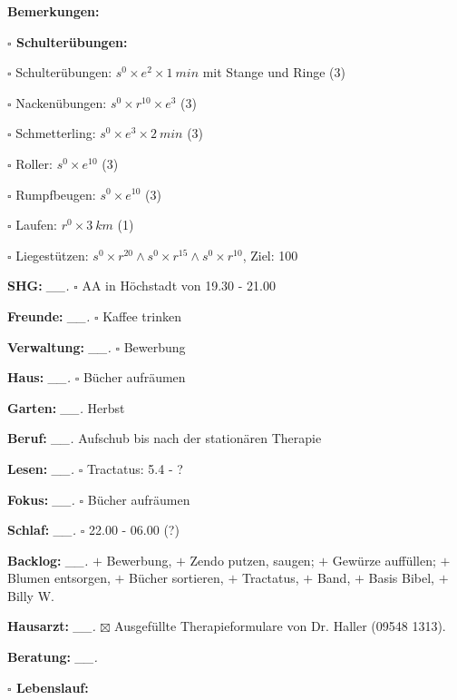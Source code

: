 \documentclass[10pt,a4paper]{article}
\newcommand\prop[1] {{\color {alizarin} {\bf #1}}}             %
\newcommand\opti[1] {{\color {amethyst} {\bf #1}}}             %
\newcommand\mand[1] {{\color {burntorange} {\bf #1}}}          %
\newcommand\topspace{\vskip -15pt \hskip 20pt}
\newcommand\bottomspace{\vskip 4pt}
\newcommand\n[1] { {\sl #1.} \hskip 5pt }
\begin{document}
\begin{mdframed}[style=daystyle]
\begin{labeling}{{\mand {Bemerkungen:}}}
\begin{minipage}{0.75\textwidth}
\begin{labeling}{\prop {$\square$ {Schulterübungen:}}}
        \setlength\itemsep{-3pt}
      \item[$\square$ Schulterübungen:] $s^0 \times e^2 \times 1\ min$ mit Stange und Ringe (3)
      \item[$\square$ Nackenübungen:]   $s^0 \times r^{10} \times e^3$ (3)
      \item[$\square$ Schmetterling:]   $s^0 \times e^3 \times 2\ min$ (3)
      \item[$\square$ Roller:]          $s^0 \times e^{10}$ (3)
      \item[$\square$ Rumpfbeugen:]     $s^0 \times e^{10}$ (3)
      \item[$\square$ Laufen:]          $r^0 \times 3\ km$ (1)
      \item[$\square$ Liegestützen:]    $s^0 \times r^{20} \land s^0 \times r^{15} \land s^0 \times r^{10}$, Ziel: 100
      \end{labeling}
    \end{minipage}
    \bottomspace        
  \item[{\mand {SHG:}}]          \n{\_\_} $\square$ AA in Höchstadt von 19.30 - 21.00
  \item[{\mand {Freunde:}}]      \n{\_\_} $\square$ Kaffee trinken
  \item[{\mand {Verwaltung:}}]   \n{\_\_} $\square$ Bewerbung
  \item[{\mand {Haus:}}]         \n{\_\_} $\square$ Bücher aufräumen
  \item[{\mand {Garten:}}]       \n{\_\_} Herbst
  \item[{\mand {Beruf:}}]        \n{\_\_} Aufschub bis nach der stationären Therapie
  \item[{\mand {Lesen:}}]        \n{\_\_} $\square$ Tractatus: 5.4 - ?
  \item[{\mand {Fokus:}}]        \n{\_\_} $\square$ Bücher aufräumen
  \item[{\mand {Schlaf:}}]       \n{\_\_} $\square$ 22.00 - 06.00 (?)
  \item[{\mand {Backlog:}}]      \n{\_\_} 
    $+$ Bewerbung,
    $+$ Zendo putzen, saugen; $+$ Gewürze auffüllen; $+$ Blumen entsorgen, $+$ Bücher sortieren,
    $+$ Tractatus, $+$ Band, $+$ Basis Bibel, $+$ Billy W. 
  \item[{\opti {Hausarzt:}}]     \n{\_\_} $\boxtimes$ Ausgefüllte Therapieformulare von
    Dr. Haller (09548 1313).
  \item[{\opti {Beratung:}}]     \n{\_\_} 
    \topspace
    \begin{minipage}{0.75\textwidth}  
      \begin{labeling}{\prop {$\square$ Lebenslauf:}}

\end{labeling}
\end{minipage}
\end{labeling}
\end{mdframed}
\end{document}
